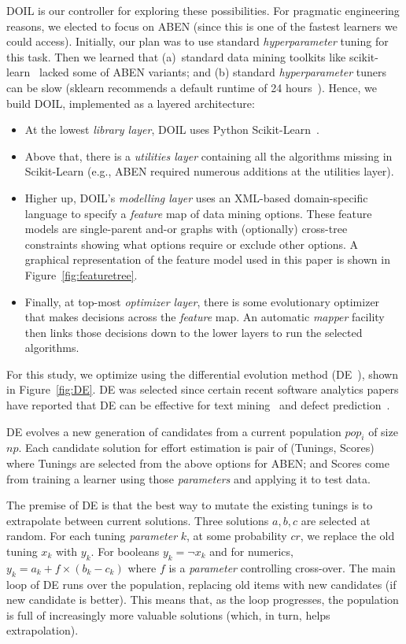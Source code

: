 \documentclass[10pt,conference]{IEEEtran}
\newcommand{\bi}{\begin{itemize}}
\newcommand{\ei}{\end{itemize}}
\newcommand{\fig}[1]{Figure~\ref{fig:#1}}
\begin{document}
DOIL is  our  controller for exploring these possibilities. For pragmatic engineering reasons,
we elected to focus on ABEN (since this is one of the fastest learners we could access).
Initially, our plan
was to use standard {\em hyperparameter} tuning for this task. Then we learned that (a)~standard data mining toolkits like scikit-learn~\cite{pedregosa2011scikit} lacked 
some of  ABEN variants; and (b) standard {\em hyperparameter} tuners can be  slow     (sklearn recommends a default runtime of 24 hours~\cite{sk18}).  Hence, we build DOIL,  implemented as a 
 layered architecture:
 \bi
 \item
At the lowest {\em library layer}, DOIL uses   Python  Scikit-Learn~\cite{pedregosa2011scikit}. 
\item
Above that, there is a {\em utilities layer} containing all the algorithms missing in Scikit-Learn (e.g., ABEN required
numerous additions at the utilities layer). 
\item
Higher up, DOIL's {\em modelling layer} uses an XML-based domain-specific language to specify a {\em feature} map of data mining options.
These feature models are single-parent and-or graphs with (optionally) cross-tree constraints showing what options require or exclude other options.
A graphical representation of  the feature model used in this paper is shown in \fig{featuretree}.
\item
Finally, at top-most {\em optimizer layer}, there is some evolutionary optimizer that makes decisions across the {\em feature} map. An automatic {\em mapper} facility then links those decisions
down to the lower layers to run the selected algorithms.  
\ei
For this study, we optimize using the differential evolution method (DE~\cite{storn1997differential}), shown in \fig{DE}. 
DE was selected since certain recent software analytics papers have reported that DE can be effective for text mining~\cite{AGRAWAL2018}
and defect prediction~\cite{Fu2016TuningFS}.


  
  DE evolves a new generation  of candidates from a current population $\mathit{pop}_i$ of size $\mathit{np}$. Each candidate solution for effort estimation
is  pair of (Tunings, Scores) where 
Tunings are selected from the above options for ABEN;
and Scores come from training a learner using those {\em parameters} and applying it to test data.

 
  The premise of DE is that the best way to mutate the existing tunings is to extrapolate between current solutions. Three solutions $a, b, c$ are selected at random. For each tuning {\em parameter} $k$, at some probability $cr$, we replace the old tuning $x_k$ with $y_k$. For
 booleans $y_k = \neg x_k$ and for numerics, 
\mbox{$y_k = a_k + f \times (b_k - c_k)$}
where $f$ is a
 {\em parameter} controlling cross-over.  
The main loop of DE runs over the population, replacing old items with new candidates (if new candidate is better). This means that, as the loop progresses, the population is full of increasingly more valuable solutions (which, in turn,
helps   extrapolation).  
\end{document}
